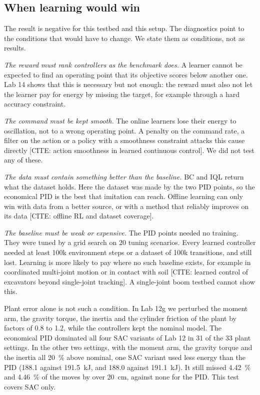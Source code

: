 \subsection{When learning would win}

The result is negative for this testbed and this setup. The diagnostics point
to the conditions that would have to change. We state them as conditions, not
as results.

\emph{The reward must rank controllers as the benchmark does.} A learner
cannot be expected to find an operating point that its objective scores below
another one. Lab 14 shows that this is necessary but not enough: the
reward must also not let the learner pay for energy by missing the target,
for example through a hard accuracy constraint.

\emph{The command must be kept smooth.} The online learners lose their energy
to oscillation, not to a wrong operating point. A penalty on the command rate,
a filter on the action or a policy with a smoothness constraint attacks this
cause directly [CITE: action smoothness in learned continuous control]. We did
not test any of these.

\emph{The data must contain something better than the baseline.} BC and IQL
return what the dataset holds. Here the dataset was made by the two PID points,
so the economical PID is the best that imitation can reach. Offline learning
can only win with data from a better source, or with a method that reliably
improves on its data [CITE: offline RL and dataset coverage].

\emph{The baseline must be weak or expensive.} The PID points needed no
training. They were tuned by a grid search on 20 tuning scenarios. %
Every learned controller needed at least 100k environment steps or a dataset of
100k transitions, and still lost. %
Learning is more likely to pay where no such baseline exists, for example in
coordinated multi-joint motion or in contact with soil [CITE: learned control
of excavators beyond single-joint tracking]. A single-joint boom testbed cannot
show this.

Plant error alone is not such a condition. In Lab 12g we perturbed the moment
arm, the gravity torque, the inertia and the cylinder friction of the plant by
factors of 0.8 to 1.2, while the controllers kept the nominal model. %
The economical PID dominated all four SAC variants of Lab 12 in 31 of the 33
plant settings. %
In the other two settings, with the moment arm, the gravity torque and the
inertia all 20~\% above nominal, one SAC variant used less energy than the PID
(188.1 against 191.5~kJ, and 188.0 against 191.1~kJ). It still missed 4.42~\%
and 4.46~\% of the moves by over 20~cm, against none for the PID. %
This test covers SAC only.

